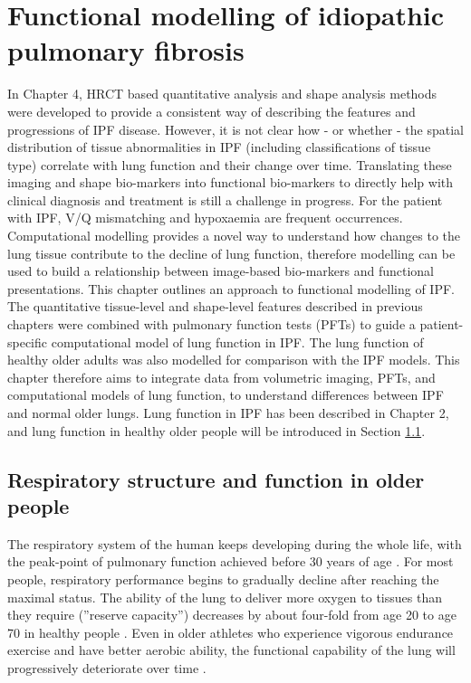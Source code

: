 \chapter{Functional modelling of idiopathic pulmonary fibrosis}\label{Yuwen_ModelBasedAnalysis}
In Chapter 4, HRCT based quantitative analysis and shape analysis methods were developed to provide a consistent way of describing the features and progressions of IPF disease. However, it is not clear how - or whether - the spatial distribution of tissue abnormalities in IPF (including classifications of tissue type) correlate with lung function and their change over time. Translating these imaging and shape bio-markers into functional bio-markers to directly help with clinical diagnosis and treatment is still a challenge in progress. For the patient with IPF, V/Q mismatching and hypoxaemia are frequent occurrences. Computational modelling provides a novel way to understand how changes to the lung tissue contribute to the decline of lung function, therefore modelling can be used to build a relationship between image-based bio-markers and functional presentations. This chapter outlines an approach to functional modelling of IPF. The quantitative tissue-level and shape-level features described in previous chapters were combined with pulmonary function tests (PFTs) to guide a patient-specific computational model of lung function in IPF. The lung function of healthy older adults was also modelled for comparison with the IPF models. This chapter therefore aims to integrate data from volumetric imaging, PFTs, and computational models of lung function, to understand differences between IPF and normal older lungs. Lung function in IPF has been described in Chapter 2, and lung function in healthy older people will be introduced in Section \ref{OlderRespiratory}.

\section{Respiratory structure and function in older people} \label{OlderRespiratory}
The respiratory system of the human keeps developing during the whole life, with the peak-point of pulmonary function achieved before 30 years of age \citep{janssens1999physiological,sprung2006age}. For most people, respiratory performance begins to gradually decline after reaching the maximal status. The ability of the lung to deliver more oxygen to tissues than they require (''reserve capacity'') decreases by about four-fold from age 20 to age 70 in healthy people \citep{smith1986respiratory,zaugg2000respiratory}. Even in older athletes who experience vigorous endurance exercise and have better aerobic ability, the functional capability of the lung will progressively deteriorate over time \citep{mittman1965relationship, pollock1997twenty, mcclaran1995longitudinal}. 

